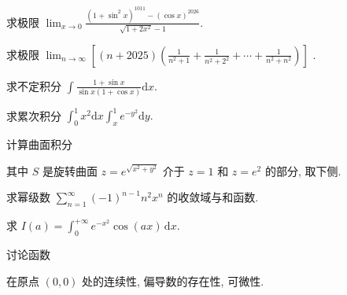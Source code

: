 求极限 $\lim_{x\to 0}\frac{(1 + \sin^2x)^{1011} - (\cos x)^{2026}}{\sqrt{1 + 2x^2} - 1}.$\par
求极限  $\lim_{n\to\infty}\left[(n+2025)\left(\frac{1}{n^{2}+1}+\frac{1}{n^{2}+2^{2}}+\cdots+\frac{1}{n^{2}+n^{2}}\right)\right]$ .\par
求不定积分 $\int \frac{1 + \sin x}{\sin x(1 + \cos x)} \mathrm{d}x.$\par
求累次积分 $\int_0^1 x^2\mathrm{d}x\int_x^1 e^{-y^2}\mathrm{d}y.$\par
\par{}
计算曲面积分\par
\nopagebreak[4]
其中 $S$ 是旋转曲面 $z = e^{\sqrt{x^2 + y^2}}$ 介于 $z = 1$ 和 $z = e^2$ 的部分, 取下侧.\par
求幂级数 $\sum_{n=1}^{\infty} (-1)^{n-1} n^2 x^n$ 的收敛域与和函数.\par
求 $I(a) = \int_{0}^{+\infty} e^{-x^2} \cos(ax) \, \mathrm{d}x$.\par
\par{}
讨论函数\par
\nopagebreak[4]
在原点 $(0,0)$ 处的连续性, 偏导数的存在性, 可微性.\par
